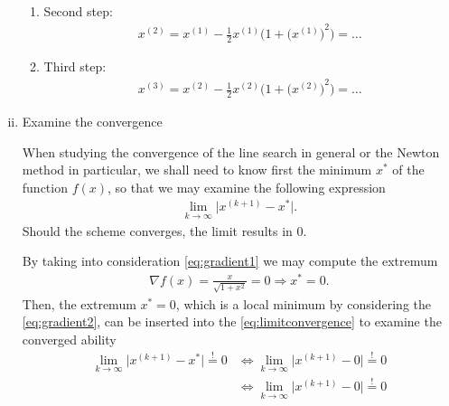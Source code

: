 \documentclass[12pt]{article}
\begin{document}
\begin{enumerate}[(i)]
\begin{enumerate}
		      \item Second step:
		            \begin{align}
			            x^{(2)} 
			            = x^{(1)} - \frac{1}{2} x^{(1)} \Bigg(1 + {\Big(x^{(1)}\Big)}^2 \Bigg)
			            = \dots
		            \end{align}
		            
		      \item Third step:
		            \begin{align}
			            x^{(3)} 
			            = x^{(2)} - \frac{1}{2} x^{(2)} \Bigg(1 + {\Big(x^{(2)}\Big)}^2 \Bigg)
			            = \dots
		            \end{align}
	      \end{enumerate}
	      
	\item Examine the convergence
	      \begin{observationboxed}
		      When studying the convergence of the line search in general or 
		      the Newton method in particular,
		      we shall need to know first the minimum $x^*$ of the function $f(x)$,
		      so that we may examine the following expression
		      \begin{align}
			      \label{eq:limitconvergence}
			      \lim_{k \to \infty} \Big| x^{(k+1)} - x^* \Big|.
		      \end{align}
		      Should the scheme converges, the limit results in $0$.
	      \end{observationboxed}
	      By taking into consideration \eqref{eq:gradient1}
	      we may compute the extremum 
	      \begin{align}
		      \nabla f (x)  
		      = 
		      \frac{x}{\sqrt{1+x^2}}
		      = 0
		      \Rightarrow
		      x^* = 0.
	      \end{align}
	      Then, the extremum $x^* = 0$, which is a local minimum
	      by considering the \eqref{eq:gradient2},
	      can be inserted into the 
	      \eqref{eq:limitconvergence}
	      to examine the converged ability
	      \begin{align}
		      \lim_{k \to \infty} \Big| x^{(k+1)} - x^* \Big| \stackrel{!}{=} 0
		       & \Leftrightarrow
		      \lim_{k \to \infty} \Big| x^{(k+1)} - 0 \Big| \stackrel{!}{=} 0                                 \\
		       & \Leftrightarrow
		      \lim_{k \to \infty} \Big| x^{(k+1)} - 0 \Big| \stackrel{!}{=} 0                                 \\

\end{align}
\end{enumerate}
\end{document}
